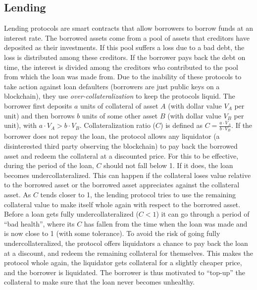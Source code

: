 \subsection{Lending}
Lending protocols are smart contracts that allow borrowers to borrow funds at an interest rate. The borrowed assets come from a pool of assets that creditors have deposited as their investments. If this pool suffers a loss due to a bad debt, the loss is distributed among these creditors. If the borrower pays back the debt on time, the interest is divided among the creditors who contributed to the pool from which the loan was made from. Due to the inability of these protocols to take action against loan defaulters (borrowers are just public keys on a blockchain), they use \textit{over-collateralization} to keep the protocols liquid. The borrower first deposits $a$ units of collateral of asset $A$ (with dollar value $V_A$ per unit) and then borrows $b$ units of some other asset $B$ (with dollar value $V_B$ per unit), with $a\cdot V_A > b\cdot V_B$. Collateralization ratio ($C$) is defined as $C = \frac{a\cdot V_A}{b\cdot V_B}$. If the borrower does not repay the loan, the protocol allows any liquidator (a disinterested third party observing the blockchain) to pay back the borrowed asset and redeem the collateral at a discounted price. For this to be effective, during the period of the loan, $C$ should not fall below 1. If it does, the loan becomes undercollateralized. This can happen if the collateral loses value relative to the borrowed asset or the borrowed asset appreciates against the collateral asset. As $C$ tends closer to 1, the lending protocol tries to use the remaining collateral value to make itself whole again with respect to the borrowed asset. Before a loan gets fully undercollateralized ($C < 1$) it can go through a period of ``bad health'', where its $C$ has fallen from the time when the loan was made and is now close to 1 (with some tolerance). To avoid the risk of going fully undercollateralized, the protocol offers liquidators a chance to pay back the loan at a discount, and redeem the remaining collateral for themselves. This makes the protocol whole again, the liquidator gets collateral for a slightly cheaper price, and the borrower is liquidated. The borrower is thus motivated to ``top-up'' the collateral to make sure that the loan never becomes unhealthy.

